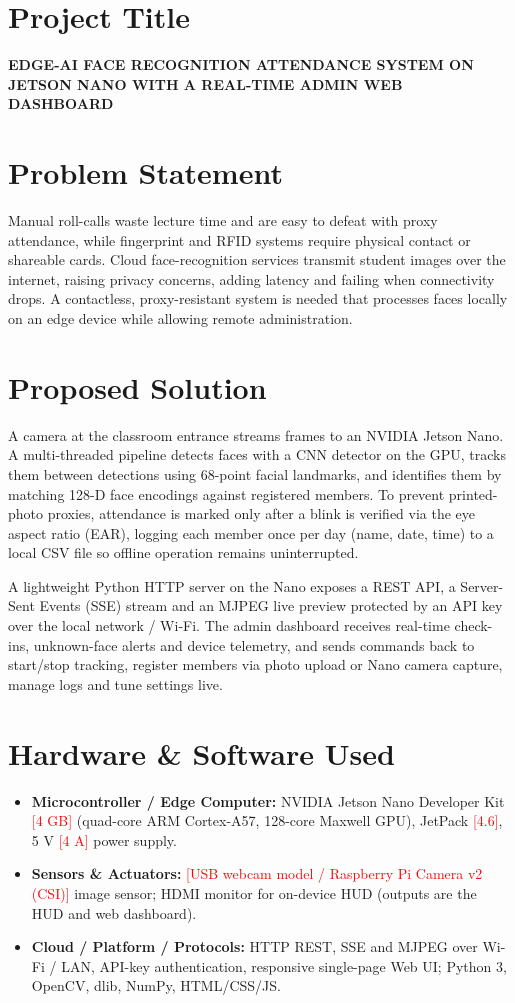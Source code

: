 \documentclass[11pt,a4paper]{article}
\newcommand{\fillin}[1]{\textcolor{red}{[#1]}}
\newcommand{\projtitle}{EDGE-AI FACE RECOGNITION ATTENDANCE SYSTEM ON JETSON NANO WITH A REAL-TIME ADMIN WEB DASHBOARD}
\begin{document}
\section{Project Title}
\textbf{\projtitle}

\section{Problem Statement}
Manual roll-calls waste lecture time and are easy to defeat with proxy attendance, while fingerprint and RFID
systems require physical contact or shareable cards. Cloud face-recognition services transmit student images
over the internet, raising privacy concerns, adding latency and failing when connectivity drops. A contactless,
proxy-resistant system is needed that processes faces locally on an edge device while allowing remote
administration.

\section{Proposed Solution}
A camera at the classroom entrance streams frames to an NVIDIA Jetson Nano. A multi-threaded pipeline detects
faces with a CNN detector on the GPU, tracks them between detections using 68-point facial landmarks, and
identifies them by matching 128-D face encodings against registered members. To prevent printed-photo proxies,
attendance is marked only after a blink is verified via the eye aspect ratio (EAR), logging each member once per
day (name, date, time) to a local CSV file so offline operation remains uninterrupted.

A lightweight Python HTTP server on the Nano exposes a REST API, a Server-Sent Events (SSE) stream and an
MJPEG live preview protected by an API key over the local network / Wi-Fi. The admin
dashboard receives real-time check-ins, unknown-face alerts and device telemetry, and sends commands back to
start/stop tracking, register members via photo upload or Nano camera capture, manage logs and tune settings live.

\section{Hardware \& Software Used}
\begin{itemize}[leftmargin=1.2em, itemsep=0pt, topsep=0pt, parsep=0pt]
  \item \textbf{Microcontroller / Edge Computer:} NVIDIA Jetson Nano Developer Kit \fillin{4 GB} (quad-core ARM
        Cortex-A57, 128-core Maxwell GPU), JetPack \fillin{4.6}, 5 V \fillin{4 A} power supply.
  \item \textbf{Sensors \& Actuators:} \fillin{USB webcam model / Raspberry Pi Camera v2 (CSI)} image
        sensor; HDMI monitor for on-device HUD (outputs are the HUD and web dashboard).
  \item \textbf{Cloud / Platform / Protocols:} HTTP REST, SSE and MJPEG over Wi-Fi / LAN, API-key
        authentication, responsive single-page Web UI; Python 3, OpenCV, dlib, NumPy, HTML/CSS/JS.
\end{itemize}
\end{document}

